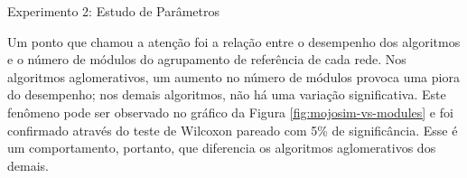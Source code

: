 \begin{section}{Experimento 2: Estudo de Parâmetros}





Um ponto que chamou a atenção foi a relação entre o desempenho dos algoritmos e o número de módulos do agrupamento de referência de cada rede. Nos algoritmos aglomerativos, um aumento no número de módulos provoca uma piora do desempenho; nos demais algoritmos, não há uma variação significativa. Este fenômeno pode ser observado no gráfico da Figura \ref{fig:mojosim-vs-modules} e foi confirmado através do teste de Wilcoxon pareado com 5\% de significância. Esse é um comportamento, portanto, que diferencia os algoritmos aglomerativos dos demais. 


\end{section}
